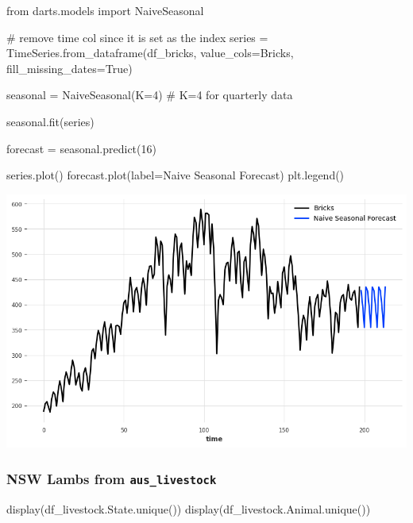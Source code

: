 \documentclass[
  11pt,
]{article}
\newenvironment{Shaded}{\begin{snugshade}}{\end{snugshade}}
\newcommand{\CommentTok}[1]{\textcolor[rgb]{0.37,0.37,0.37}{#1}}
\newcommand{\DecValTok}[1]{\textcolor[rgb]{0.68,0.00,0.00}{#1}}
\newcommand{\ImportTok}[1]{\textcolor[rgb]{0.00,0.46,0.62}{#1}}
\newcommand{\NormalTok}[1]{\textcolor[rgb]{0.00,0.23,0.31}{#1}}
\newcommand{\OperatorTok}[1]{\textcolor[rgb]{0.37,0.37,0.37}{#1}}
\newcommand{\StringTok}[1]{\textcolor[rgb]{0.13,0.47,0.30}{#1}}
\newcommand{\VariableTok}[1]{\textcolor[rgb]{0.07,0.07,0.07}{#1}}
\begin{document}
\begin{Shaded}
\begin{Highlighting}[]
\ImportTok{from}\NormalTok{ darts.models }\ImportTok{import}\NormalTok{ NaiveSeasonal}

\CommentTok{\# remove time col since it is set as the index}
\NormalTok{series }\OperatorTok{=}\NormalTok{ TimeSeries.from\_dataframe(df\_bricks, value\_cols}\OperatorTok{=}\StringTok{\textquotesingle{}Bricks\textquotesingle{}}\NormalTok{, fill\_missing\_dates}\OperatorTok{=}\VariableTok{True}\NormalTok{)}

\NormalTok{seasonal }\OperatorTok{=}\NormalTok{ NaiveSeasonal(K}\OperatorTok{=}\DecValTok{4}\NormalTok{) }\CommentTok{\# K=4 for quarterly data}

\NormalTok{seasonal.fit(series)}

\NormalTok{forecast }\OperatorTok{=}\NormalTok{ seasonal.predict(}\DecValTok{16}\NormalTok{)}

\NormalTok{series.plot()}
\NormalTok{forecast.plot(label}\OperatorTok{=}\StringTok{\textquotesingle{}Naive Seasonal Forecast\textquotesingle{}}\NormalTok{)}
\NormalTok{plt.legend()}
\end{Highlighting}
\end{Shaded}

\includegraphics{hw3_files/figure-pdf/cell-14-output-1.png}

\subsubsection{\texorpdfstring{NSW Lambs from
\texttt{aus\_livestock}}{NSW Lambs from aus\_livestock}}\label{nsw-lambs-from-aus_livestock}

\begin{Shaded}
\begin{Highlighting}[]
\NormalTok{display(df\_livestock.State.unique())}
\NormalTok{display(df\_livestock.Animal.unique())}
\end{Highlighting}
\end{Shaded}
\end{document}
